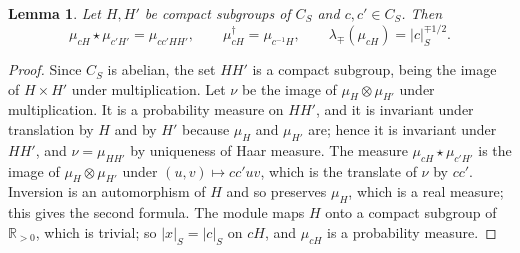 \documentclass[11pt]{amsart}
\newtheorem{lemma}[theorem]{Lemma}
\theoremstyle{definition}
\newcommand{\R}{\mathbb R}
\begin{document}
\begin{lemma}\label{lem:coset}
Let $H,H'$ be compact subgroups of $C_S$ and $c,c'\in C_S$. Then
\[
  \mu_{cH}\star\mu_{c'H'}=\mu_{cc'HH'},\qquad
  \mu_{cH}^\dagger=\mu_{c^{-1}H},\qquad
  \lambda_\mp(\mu_{cH})=|c|_S^{\mp1/2}.
\]
\end{lemma}

\begin{proof}
Since $C_S$ is abelian, the set $HH'$ is a compact subgroup, being the image
of $H\times H'$ under multiplication. Let $\nu$ be the image of $\mu_H\otimes\mu_{H'}$ under
multiplication. It is a probability measure on $HH'$, and it is invariant
under translation by $H$ and by $H'$ because $\mu_H$ and $\mu_{H'}$ are; hence
it is invariant under $HH'$, and $\nu=\mu_{HH'}$ by uniqueness of Haar
measure. The measure $\mu_{cH}\star\mu_{c'H'}$ is the image of
$\mu_H\otimes\mu_{H'}$ under $(u,v)\mapsto cc'uv$, which is the translate of
$\nu$ by $cc'$. Inversion is an automorphism of $H$ and so preserves $\mu_H$,
which is a real measure; this gives the second formula. The module maps $H$
onto a compact subgroup of $\R_{>0}$, which is trivial; so $|x|_S=|c|_S$ on
$cH$, and $\mu_{cH}$ is a probability measure.
\end{proof}
\end{document}

